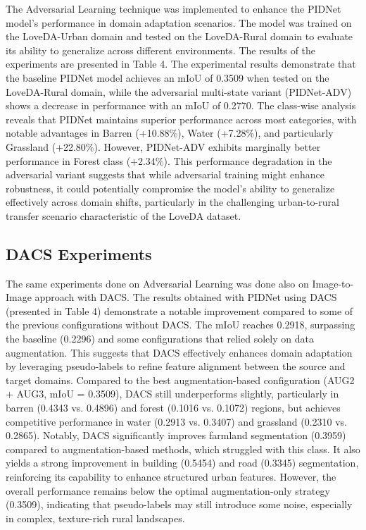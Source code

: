 \documentclass[10pt,twocolumn,letterpaper]{article}
\begin{document}
The Adversarial Learning technique was implemented to enhance the PIDNet model's performance in domain adaptation scenarios. The model was trained on the LoveDA-Urban domain and tested on the LoveDA-Rural domain to evaluate its ability to generalize across different environments. The results of the experiments are presented in Table 4.
The experimental results demonstrate that the baseline PIDNet model achieves an mIoU of 0.3509 when tested on the LoveDA-Rural domain, while the adversarial multi-state variant (PIDNet-ADV) shows a decrease in performance with an mIoU of 0.2770. The class-wise analysis reveals that PIDNet maintains superior performance across most categories, with notable advantages in Barren (+10.88\%), Water (+7.28\%), and particularly Grassland (+22.80\%). However, PIDNet-ADV exhibits marginally better performance in Forest class (+2.34\%). This performance degradation in the adversarial variant suggests that while adversarial training might enhance robustness, it could potentially compromise the model's ability to generalize effectively across domain shifts, particularly in the challenging urban-to-rural transfer scenario characteristic of the LoveDA dataset.

\subsection{DACS Experiments}

The same experiments done on Adversarial Learning was done also on Image-to-Image approach with DACS. The results obtained with PIDNet using DACS (presented in Table 4) demonstrate a notable improvement compared to some of the previous configurations without DACS. The mIoU reaches 0.2918, surpassing the baseline (0.2296) and some configurations that relied solely on data augmentation. This suggests that DACS effectively enhances domain adaptation by leveraging pseudo-labels to refine feature alignment between the source and target domains. Compared to the best augmentation-based configuration (AUG2 + AUG3, mIoU = 0.3509), DACS still underperforms slightly, particularly in barren (0.4343 vs. 0.4896) and forest (0.1016 vs. 0.1072) regions, but achieves competitive performance in water (0.2913 vs. 0.3407) and grassland (0.2310 vs. 0.2865).
Notably, DACS significantly improves farmland segmentation (0.3959) compared to augmentation-based methods, which struggled with this class. It also yields a strong improvement in building (0.5454) and road (0.3345) segmentation, reinforcing its capability to enhance structured urban features. However, the overall performance remains below the optimal augmentation-only strategy (0.3509), indicating that pseudo-labels may still introduce some noise, especially in complex, texture-rich rural landscapes. 
\end{document}
